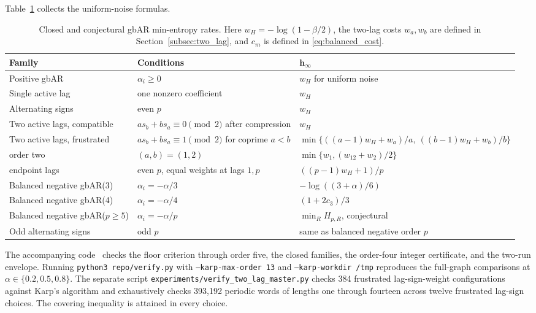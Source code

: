 \documentclass[11pt,a4paper]{article}
\begin{document}
Table~\ref{tab:family_summary} collects the uniform-noise formulas.

\begin{table}[htbp]
\centering
\caption{Closed and conjectural gbAR min-entropy rates.  Here
$w_H=-\log(1-\beta/2)$, the two-lag costs $w_a,w_b$ are defined in
Section~\ref{subsec:two_lag}, and $c_m$ is defined in
\eqref{eq:balanced_cost}.}
\label{tab:family_summary}
\footnotesize
\setlength{\tabcolsep}{4pt}
\renewcommand{\arraystretch}{1.12}
\begin{tabular}{p{}p{}p{}}
\toprule
\textbf{Family} & \textbf{Conditions} & $\boldsymbol{h_\infty}$\\
\midrule
Positive gbAR & $\alpha_i\ge0$ & $w_H$ for uniform noise\\
Single active lag & one nonzero coefficient & $w_H$\\
Alternating signs & even $p$ & $w_H$\\
\midrule
Two active lags, compatible & $as_b+bs_a\equiv0\pmod2$ after compression &
$w_H$\\
Two active lags, frustrated & $as_b+bs_a\equiv1\pmod2$ for coprime $a<b$ &
$\min\{((a-1)w_H+w_a)/a,\ ((b-1)w_H+w_b)/b\}$\\
\quad order two & $(a,b)=(1,2)$ &
$\min\{w_1,(w_{12}+w_2)/2\}$\\
\quad endpoint lags & even $p$, equal weights at lags $1,p$ &
$((p-1)w_H+1)/p$\\
\midrule
Balanced negative gbAR(3) & $\alpha_i=-\alpha/3$ &
$-\log((3+\alpha)/6)$\\
Balanced negative gbAR(4) & $\alpha_i=-\alpha/4$ &
$(1+2c_3)/3$\\
Balanced negative gbAR($p\ge5$) & $\alpha_i=-\alpha/p$ &
$\min_R H_{p,R}$, conjectural\\
Odd alternating signs & odd $p$ &
same as balanced negative order $p$\\
\bottomrule
\end{tabular}
\end{table}

The accompanying code~\cite{advances_min_entropy_repo} checks the
floor criterion through order five, the closed families, the order-four
integer certificate, and the two-run envelope.  Running
\texttt{python3 repo/verify.py} with \texttt{--karp-max-order 13}
and \texttt{--karp-workdir /tmp} reproduces the full-graph comparisons at
$\alpha\in\{0.2,0.5,0.8\}$.
The separate script \texttt{experiments/verify\_two\_lag\_master.py}
checks 384 frustrated lag-sign-weight configurations against Karp's
algorithm and exhaustively checks 393,192 periodic words of lengths
one through fourteen across twelve frustrated lag-sign choices.
The covering inequality is attained in every choice.
\end{document}
